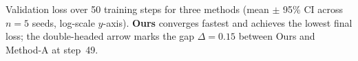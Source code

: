 \caption{Validation loss over 50 training steps for three methods (mean $\pm$ 95\% CI across $n{=}5$ seeds, log-scale $y$-axis). \textbf{Ours} converges fastest and achieves the lowest final loss; the double-headed arrow marks the gap $\Delta{=}0.15$ between Ours and Method-A at step~49.}
